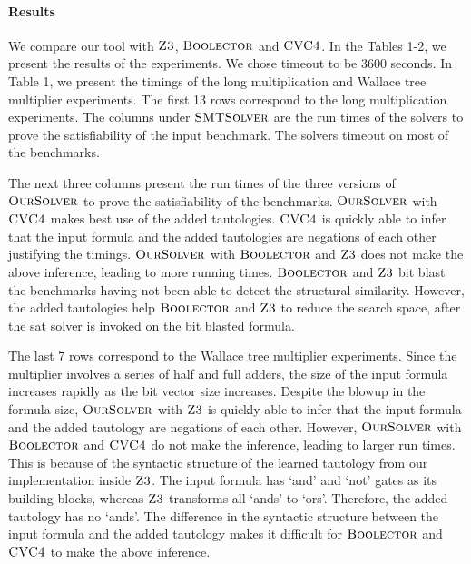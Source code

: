 \paragraph{\bf Results}
%
We compare our tool with $\textsc{Z3}$, $\textsc{Boolector}$ and $\textsc{CVC4}$.
%
In the Tables 1-2, we present the results of the experiments.
%
We chose timeout to be 3600 seconds.
%
In Table 1, we present the timings of the long multiplication and
Wallace tree multiplier experiments.
%
The first 13 rows correspond to
the long multiplication experiments.
%
The columns under $\textsc{SMTSolver}$ are the run times of the
solvers to prove the satisfiability of the input benchmark.
%
The solvers timeout on most of the benchmarks.
%



The next three columns present the run times of the three versions of
$\textsc{OurSolver}$ to prove the satisfiability of the benchmarks.
%
$\textsc{OurSolver}$ with $\textsc{CVC4}$ makes best use of the added tautologies.
%
$\textsc{CVC4}$ is quickly able to infer that the input formula and the
added tautologies are negations of each other justifying the timings.
%
$\textsc{OurSolver}$ with $\textsc{Boolector}$ and $\textsc{Z3}$ does not make the above
inference, leading to more running times.
%
$\textsc{Boolector}$ and $\textsc{Z3}$ bit blast the benchmarks having not been
able to detect the structural similarity.
%
However, the added tautologies help $\textsc{Boolector}$ and $\textsc{Z3}$ to
reduce the search space, after the sat solver is invoked on the bit
blasted formula.


The last 7 rows correspond to the Wallace tree multiplier experiments.
%
Since the multiplier involves a series of half and full adders, the
size of the input formula increases rapidly as the bit vector size
increases.
%
Despite the blowup in the formula size, $\textsc{OurSolver}$ with $\textsc{Z3}$ is
quickly able to infer that the input formula and the added tautology
are negations of each other.
%
However, $\textsc{OurSolver}$ with $\textsc{Boolector}$ and $\textsc{CVC4}$ do not make the
inference, leading to larger run times.
%
This is because of the syntactic structure of the learned tautology
from our implementation inside $\textsc{Z3}$.
%
The input formula has `and' and `not' gates as its building blocks,
whereas $\textsc{Z3}$ transforms all `ands' to `ors'.
%
Therefore, the added tautology has no `ands'.
%
The difference in the syntactic structure between the input formula
and the added tautology makes it difficult for $\textsc{Boolector}$ and
$\textsc{CVC4}$ to make the above inference.
%


